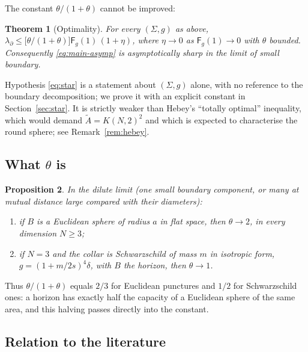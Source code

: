 \documentclass[11pt,reqno]{amsart}
\theoremstyle{plain}
\newtheorem{theorem}{Theorem}[section]
\newtheorem{proposition}[theorem]{Proposition}
\theoremstyle{definition}
\newcommand{\Fq}{\mathsf{F}}
\newcommand{\Ksob}{K}
\newcommand{\Atil}{\widetilde{A}}
\begin{document}
The constant $\theta/(1+\theta)$ cannot be improved:

\begin{theorem}[Optimality]
\label{thm:sharp}
For every $(\Sigma,g)$ as above,
$\lambda_\partial\le\bigl[\theta/(1+\theta)\bigr]\Fq_g(1)\,(1+\eta)$, where
$\eta\to0$ as $\Fq_g(1)\to0$ with $\theta$ bounded. Consequently
\eqref{eq:main-asymp} is asymptotically sharp in the limit of small boundary.
\end{theorem}

Hypothesis \eqref{eq:star} is a statement about $(\Sigma,g)$ alone, with no
reference to the boundary decomposition; we prove it with an explicit constant in
Section~\ref{sec:star}. It is strictly weaker than Hebey's ``totally optimal''
inequality, which would demand $\Atil=\Ksob(N,2)^2$ and which is expected to
characterise the round sphere; see Remark~\ref{rem:hebey}.

\subsection{What \texorpdfstring{$\theta$}{theta} is}
\begin{proposition}
\label{prop:theta-examples}
In the dilute limit (one small boundary component, or many at mutual distance
large compared with their diameters):
\begin{enumerate}
\item if $B$ is a Euclidean sphere of radius $a$ in flat space, then
      $\theta\to2$, \emph{in every dimension $N\ge3$};
\item if $N=3$ and the collar is Schwarzschild of mass $m$ in isotropic form,
      $g=(1+m/2s)^4\delta$, with $B$ the horizon, then $\theta\to1$.
\end{enumerate}
\end{proposition}

Thus $\theta/(1+\theta)$ equals $2/3$ for Euclidean punctures and $1/2$ for
Schwarzschild ones: a horizon has exactly half the capacity of a Euclidean sphere
of the same area, and this halving passes directly into the constant.

\subsection{Relation to the literature}
\label{sec:literature}
\end{document}

